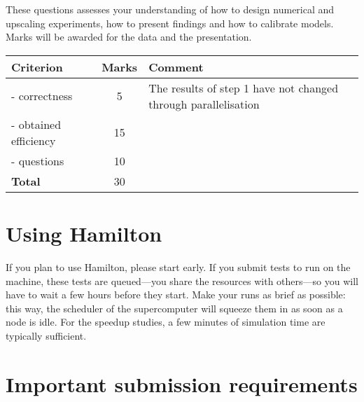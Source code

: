 \documentclass[11pt,a4paper,DIV=12,pdftex]{scrartcl}
\begin{document}
These questions assesses your understanding of how to design numerical and upscaling experiments, how to present findings and how to calibrate models. Marks will be awarded for the data and the presentation.

\begin{table}[h]
\centering
 \begin{tabular}{|l|c|p{7cm}|}
 \hline
 \textbf{Criterion} & \textbf{Marks} &\textbf{Comment}\\
\hline
- correctness & 5 & The results of step 1 have not  changed through parallelisation\\
- obtained efficiency & 15 &\\
- questions & 10 & \\
    \hline
\textbf{Total} & 30 & \\
 \hline
 \end{tabular}
\end{table}


\section*{Using Hamilton}

If you plan to use Hamilton, please start early. If you submit tests to run on the machine, these tests are queued—you share the resources with others—so you will have to wait a few hours before they start. Make your runs as brief as possible: this way, the scheduler of the supercomputer will squeeze them in as soon as a node is idle. For the speedup studies, a few minutes of simulation time are typically sufficient.


\section*{Important submission requirements}
\end{document}
